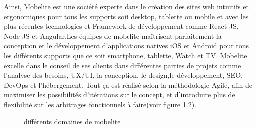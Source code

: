 
    
Ainsi, Mobelite est une société experte dans le création des sites web intuitifs et ergonomiques pour tous les supports soit desktop, tablette ou mobile et avec les plus récentes technologies et Framework de développement comme React JS, Node JS et Angular.Les équipes de mobelite maîtrisent parfaitement la conception et le développement d’applications natives iOS et Android pour tous les différents supports que ce soit smartphone, tablette, Watch et TV. Mobelite excelle dans le conseil de ses clients dans différentes parties de projets comme l'analyse des besoins, UX/UI, la conception, le design,le développement, SEO, DevOps et l'hébergement. Tout ça est réalisé selon la méthodologie Agile, afin de maximiser les possibilités d’itérations sur le concept, et d’introduire plus de flexibilité sur les arbitrages fonctionnels à faire(voir figure 1.2).\\[0.3cm]

\begin{figure}[H]
    \centering
    \caption{différents domaines de mobelite}
\end{figure}

